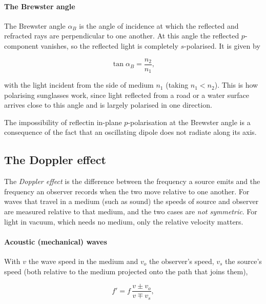         \paragraph{The Brewster angle}

        The Brewster angle $\alpha_{B}$ is the angle of incidence at which the reflected and refracted rays are perpendicular to one another. At this angle the reflected $p$-component vanishes, so the reflected light is completely $s$-polarised. It is given by

        \begin{equation}\label{eq:brewster}
            \tan{\alpha_{B}} = \frac{n_{2}}{n_{1}},
        \end{equation}

        with the light incident from the side of medium $n_1$ (taking $n_1 < n_2$). This is how polarising sunglasses work, since light reflected from a road or a water surface arrives close to this angle and is largely polarised in one direction.

        The impossibility of reflectin in-plane $p$-polarisation at the Brewster angle is a consequence of the fact that an oscillating dipole does not radiate along its axis.

    \subsection{The Doppler effect}

        The \emph{Doppler effect} is the difference between the frequency a source emits and the frequency an observer records when the two move relative to one another. For waves that travel in a medium (such as sound) the speeds of source and observer are measured relative to that medium, and the two cases are \emph{not symmetric}. For light in vacuum, which needs no medium, only the relative velocity matters.

        \paragraph{Acoustic (mechanical) waves}

        With $v$ the wave speed in the medium and $v_o$ the observer's speed, $v_s$ the source's speed (both relative to the medium projected onto the path that joins them),

        \begin{equation}\label{eq:doppler-acoustic}
            f' = f\,\frac{v \pm v_o}{v \mp v_s},
        \end{equation}

